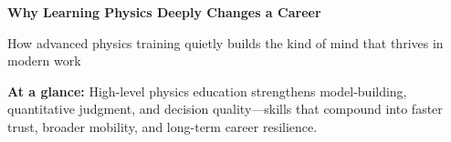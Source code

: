 \documentclass[11pt]{article}
\begin{document}
\vspace*{0.35em}
{\fontsize{22}{25}\selectfont\textbf{Why Learning Physics Deeply Changes a Career}}\par\vspace{0.35em}
{\large\textcolor{crimsonviolet}{How advanced physics training quietly builds the kind of mind that thrives in modern work}}\par\vspace{0.95em}

\begin{tcolorbox}
\textbf{At a glance:} High-level physics education strengthens model-building, quantitative judgment, and decision quality---skills that compound into faster trust, broader mobility, and long-term career resilience.
\end{tcolorbox}

\vspace{0.6em}
\end{document}
